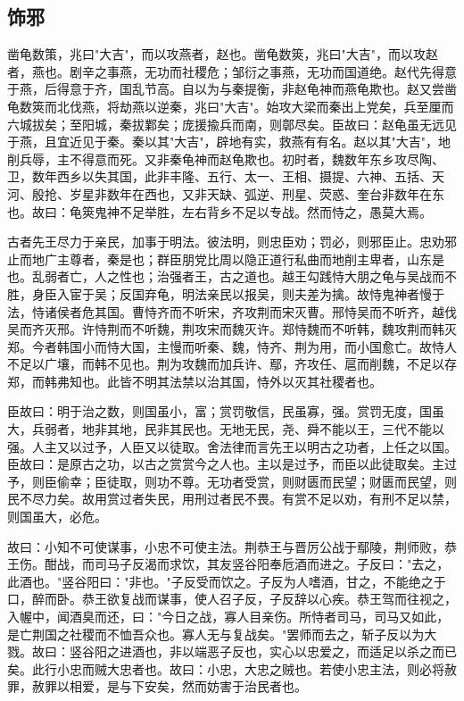 \documentclass[]{article}
\begin{document}
\hypertarget{header-n927}{%
\subsection{饰邪}\label{header-n927}}

凿龟数策，兆曰"大吉"，而以攻燕者，赵也。凿龟数筴，兆曰"大吉"，而以攻赵者，燕也。剧辛之事燕，无功而社稷危；邹衍之事燕，无功而国道绝。赵代先得意于燕，后得意于齐，国乱节高。自以为与秦提衡，非赵龟神而燕龟欺也。赵又尝凿龟数筴而北伐燕，将劫燕以逆秦，兆曰"大吉"。始攻大梁而秦出上党矣，兵至厘而六城拔矣；至阳城，秦拔鄴矣；庞援揄兵而南，则鄣尽矣。臣故曰：赵龟虽无远见于燕，且宜近见于秦。秦以其"大吉"，辟地有实，救燕有有名。赵以其"大吉"，地削兵辱，主不得意而死。又非秦龟神而赵龟欺也。初时者，魏数年东乡攻尽陶、卫，数年西乡以失其国，此非丰隆、五行、太一、王相、摄提、六神、五括、天河、殷抢、岁星非数年在西也，又非天缺、弧逆、刑星、荧惑、奎台非数年在东也。故曰：龟筴鬼神不足举胜，左右背乡不足以专战。然而恃之，愚莫大焉。

古者先王尽力于亲民，加事于明法。彼法明，则忠臣劝；罚必，则邪臣止。忠劝邪止而地广主尊者，秦是也；群臣朋党比周以隐正道行私曲而地削主卑者，山东是也。乱弱者亡，人之性也；治强者王，古之道也。越王勾践恃大朋之龟与吴战而不胜，身臣入宦于吴；反国弃龟，明法亲民以报吴，则夫差为擒。故恃鬼神者慢于法，恃诸侯者危其国。曹恃齐而不听宋，齐攻荆而宋灭曹。邢恃吴而不听齐，越伐吴而齐灭邢。许恃荆而不听魏，荆攻宋而魏灭许。郑恃魏而不听韩，魏攻荆而韩灭郑。今者韩国小而恃大国，主慢而听秦、魏，恃齐、荆为用，而小国愈亡。故恃人不足以广壤，而韩不见也。荆为攻魏而加兵许、鄢，齐攻任、扈而削魏，不足以存郑，而韩弗知也。此皆不明其法禁以治其国，恃外以灭其社稷者也。

臣故曰：明于治之数，则国虽小，富；赏罚敬信，民虽寡，强。赏罚无度，国虽大，兵弱者，地非其地，民非其民也。无地无民，尧、舜不能以王，三代不能以强。人主又以过予，人臣又以徒取。舍法律而言先王以明古之功者，上任之以国。臣故曰：是原古之功，以古之赏赏今之人也。主以是过予，而臣以此徒取矣。主过予，则臣偷幸；臣徒取，则功不尊。无功者受赏，则财匮而民望；财匮而民望，则民不尽力矣。故用赏过者失民，用刑过者民不畏。有赏不足以劝，有刑不足以禁，则国虽大，必危。

故曰：小知不可使谋事，小忠不可使主法。荆恭王与晋厉公战于鄢陵，荆师败，恭王伤。酣战，而司马子反渴而求饮，其友竖谷阳奉卮酒而进之。子反曰："去之，此酒也。"竖谷阳曰："非也。"子反受而饮之。子反为人嗜酒，甘之，不能绝之于口，醉而卧。恭王欲复战而谋事，使人召子反，子反辞以心疾。恭王驾而往视之，入幄中，闻酒臭而还，曰："今日之战，寡人目亲伤。所恃者司马，司马又如此，是亡荆国之社稷而不恤吾众也。寡人无与复战矣。"罢师而去之，斩子反以为大戮。故曰：竖谷阳之进酒也，非以端恶子反也，实心以忠爱之，而适足以杀之而已矣。此行小忠而贼大忠者也。故曰：小忠，大忠之贼也。若使小忠主法，则必将赦罪，赦罪以相爱，是与下安矣，然而妨害于治民者也。
\end{document}

